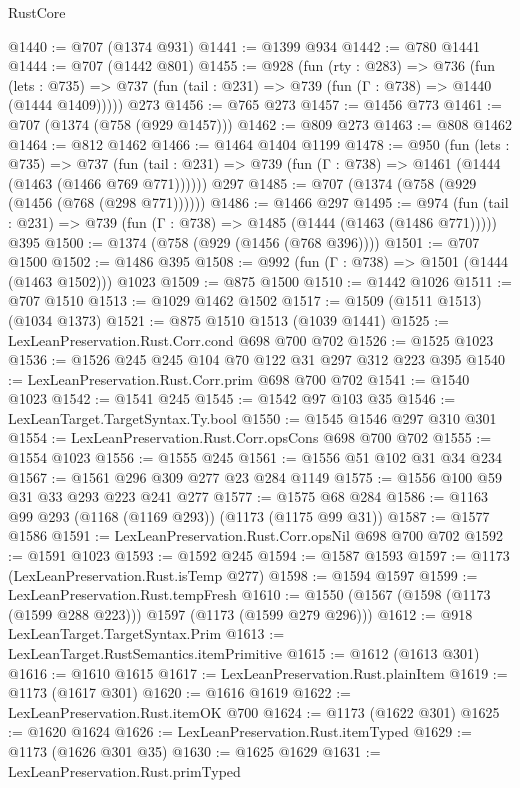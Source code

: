 \begin{lexlean}{RustCore}
\begin{coremodule}
@1440 := @707 (@1374 @931)
@1441 := @1399 @934
@1442 := @780 @1441
@1444 := @707 (@1442 @801)
@1455 := @928
    (fun (rty : @283) =>
    @736
      (fun (lets : @735) =>
      @737 (fun (tail : @231) => @739 (fun (Γ : @738) => @1440 (@1444 @1409)))))
    @273
@1456 := @765 @273
@1457 := @1456 @773
@1461 := @707 (@1374 (@758 (@929 @1457)))
@1462 := @809 @273
@1463 := @808 @1462
@1464 := @812 @1462
@1466 := @1464 @1404 @1199
@1478 := @950
    (fun (lets : @735) =>
    @737 (fun (tail : @231) => @739 (fun (Γ : @738) => @1461 (@1444 (@1463 (@1466 @769 @771))))))
    @297
@1485 := @707 (@1374 (@758 (@929 (@1456 (@768 (@298 @771))))))
@1486 := @1466 @297
@1495 := @974
    (fun (tail : @231) => @739 (fun (Γ : @738) => @1485 (@1444 (@1463 (@1486 @771)))))
    @395
@1500 := @1374 (@758 (@929 (@1456 (@768 @396))))
@1501 := @707 @1500
@1502 := @1486 @395
@1508 := @992 (fun (Γ : @738) => @1501 (@1444 (@1463 @1502))) @1023
@1509 := @875 @1500
@1510 := @1442 @1026
@1511 := @707 @1510
@1513 := @1029 @1462 @1502
@1517 := @1509 (@1511 @1513) (@1034 @1373)
@1521 := @875 @1510 @1513 (@1039 @1441)
@1525 := LexLeanPreservation.Rust.Corr.cond @698 @700 @702
@1526 := @1525 @1023
@1536 := @1526 @245 @245 @104 @70 @122 @31 @297 @312 @223 @395
@1540 := LexLeanPreservation.Rust.Corr.prim @698 @700 @702
@1541 := @1540 @1023
@1542 := @1541 @245
@1545 := @1542 @97 @103 @35
@1546 := LexLeanTarget.TargetSyntax.Ty.bool
@1550 := @1545 @1546 @297 @310 @301
@1554 := LexLeanPreservation.Rust.Corr.opsCons @698 @700 @702
@1555 := @1554 @1023
@1556 := @1555 @245
@1561 := @1556 @51 @102 @31 @34 @234
@1567 := @1561 @296 @309 @277 @23 @284 @1149
@1575 := @1556 @100 @59 @31 @33 @293 @223 @241 @277
@1577 := @1575 @68 @284
@1586 := @1163 @99 @293 (@1168 (@1169 @293)) (@1173 (@1175 @99 @31))
@1587 := @1577 @1586
@1591 := LexLeanPreservation.Rust.Corr.opsNil @698 @700 @702
@1592 := @1591 @1023
@1593 := @1592 @245
@1594 := @1587 @1593
@1597 := @1173 (LexLeanPreservation.Rust.isTemp @277)
@1598 := @1594 @1597
@1599 := LexLeanPreservation.Rust.tempFresh
@1610 := @1550 (@1567 (@1598 (@1173 (@1599 @288 @223))) @1597 (@1173 (@1599 @279 @296)))
@1612 := @918 LexLeanTarget.TargetSyntax.Prim
@1613 := LexLeanTarget.RustSemantics.itemPrimitive
@1615 := @1612 (@1613 @301)
@1616 := @1610 @1615
@1617 := LexLeanPreservation.Rust.plainItem
@1619 := @1173 (@1617 @301)
@1620 := @1616 @1619
@1622 := LexLeanPreservation.Rust.itemOK @700
@1624 := @1173 (@1622 @301)
@1625 := @1620 @1624
@1626 := LexLeanPreservation.Rust.itemTyped
@1629 := @1173 (@1626 @301 @35)
@1630 := @1625 @1629
@1631 := LexLeanPreservation.Rust.primTyped

\end{coremodule}
\end{lexlean}
